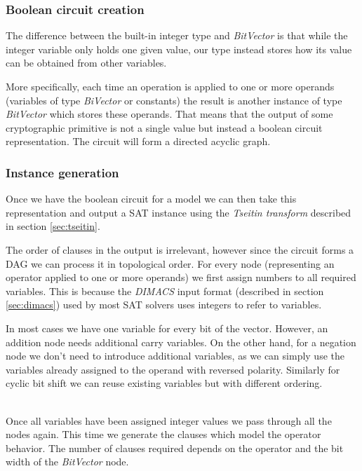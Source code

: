 \subsubsection{Boolean circuit creation}
The difference between the built-in integer type and \emph{BitVector} is that while the integer variable only holds one given value, our type instead stores how its value can be obtained from other variables.

More specifically, each time an operation is applied to one or more operands (variables of type \emph{BiVector} or constants) the result is another instance of type \emph{BitVector} which stores these operands.  That means that the output of some cryptographic primitive is not a single value but instead a boolean circuit representation. The circuit will form a directed acyclic graph.

\subsubsection{Instance generation}
Once we have the boolean circuit for a model we can then take this representation and output a SAT instance using the \emph{Tseitin transform} described in section \ref{sec:tseitin}.

The order of clauses in the output is irrelevant, however since the circuit forms a DAG we can process it in topological order.
For every node (representing an operator applied to one or more operands) we first assign numbers to all required variables.
This is because the \emph{DIMACS} input format (described in section \ref{sec:dimacs}) used by most SAT solvers uses integers to refer to variables.

In most cases we have one variable for every bit of the vector.
However, an addition node needs additional carry variables.
On the other hand, for a negation node we don't need to introduce additional variables, as we can simply use the variables already assigned to the operand with reversed polarity.
Similarly for cyclic bit shift we can reuse existing variables but with different ordering.

~\\

Once all variables have been assigned integer values we pass through all the nodes again.
This time we generate the clauses which model the operator behavior.
The number of clauses required depends on the operator and the bit width of the \emph{BitVector} node.

